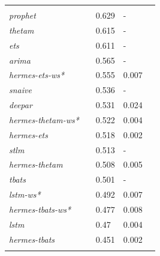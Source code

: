 \documentclass[10pt]{article} %
\begin{document}
\begin{table}
{\begin{tabular}{l||llll}
	\hline
	 &&& \\
     \textit{prophet} && 0.629 & -\\ 
	 \textit{thetam} && 0.615 & -\\ 
	 \textit{ets} && 0.611 & -\\ 
	 \textit{arima} && 0.565 & -\\ 
	 \textit{hermes-ets-ws*} && 0.555 & 0.007\\ 
	 \textit{snaive} && 0.536 & -\\  
	 \textit{deepar} && 0.531 & 0.024\\ 
 	 \textit{hermes-thetam-ws*} && 0.522 & 0.004\\ 
	 \textit{hermes-ets} && 0.518 & 0.002\\ 
	 \textit{stlm} && 0.513 & -\\ 
	 \textit{hermes-thetam} && 0.508 & 0.005\\ 
	 \textit{tbats} && 0.501 & -\\ 
	 \textit{lstm-ws*} && 0.492 & 0.007\\ 
	 \textit{hermes-tbats-ws*} && 0.477 & 0.008\\ 
	 \textit{lstm} && 0.47 & 0.004\\ 
	 \textit{hermes-tbats} && 0.451 & 0.002\\  \vspace{0.5cm}\\
  \end{tabular}
 }
\end{table}
\end{document}
